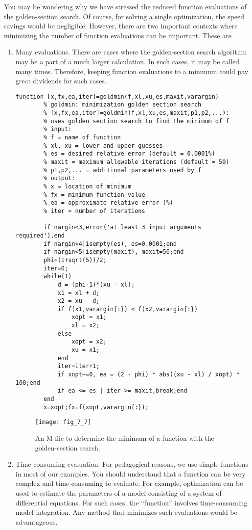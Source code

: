 \documentclass[../main.tex]{subfiles}
\begin{document}
You may be wondering why we have stressed the reduced function evaluations of the
golden-section search. Of course, for solving a single optimization, the speed savings
would be negligible. However, there are two important contexts where minimizing the
number of function evaluations can be important. These are
\begin{enumerate}
	\item Many evaluations. There are cases where the golden-section search algorithm may be a
	part of a much larger calculation. In such cases, it may be called many times. Therefore,
	keeping function evaluations to a minimum could pay great dividends for such cases.


	\begin{lstlisting}[numbers=none,frame=none]
		function [x,fx,ea,iter]=goldmin(f,xl,xu,es,maxit,varargin)
		% goldmin: minimization golden section search
		% [x,fx,ea,iter]=goldmin(f,xl,xu,es,maxit,p1,p2,...):
		% uses golden section search to find the minimum of f
		% input:
		% f = name of function
		% xl, xu = lower and upper guesses
		% es = desired relative error (default = 0.0001%)
		% maxit = maximum allowable iterations (default = 50)
		% p1,p2,... = additional parameters used by f
		% output:
		% x = location of minimum
		% fx = minimum function value
		% ea = approximate relative error (%)
		% iter = number of iterations

		if nargin<3,error('at least 3 input arguments required'),end
		if nargin<4|isempty(es), es=0.0001;end
		if nargin<5|isempty(maxit), maxit=50;end
		phi=(1+sqrt(5))/2;
		iter=0;
		while(1)
			d = (phi-1)*(xu - xl);
			x1 = xl + d;
			x2 = xu - d;
			if f(x1,varargin{:}) < f(x2,varargin{:})
				xopt = x1;
				xl = x2;
			else
				xopt = x2;
				xu = x1;
			end
			iter=iter+1;
			if xopt~=0, ea = (2 - phi) * abs((xu - xl) / xopt) * 100;end
			if ea <= es | iter >= maxit,break,end
		end
		x=xopt;fx=f(xopt,varargin{:});
	\end{lstlisting}

	\begin{figure}[H]
		\centering
		\texttt{[image: fig\_7\_7]}
		\caption{\textsf{An M-file to determine the minimum of a function with the golden-section search.}}
		\label{fig:fig_7_7}
	\end{figure}

	\item Time-consuming evaluation. For pedagogical reasons, we use simple functions in
	most of our examples. You should understand that a function can be very complex
	and time-consuming to evaluate. For example, optimization can be used to estimate
	the parameters of a model consisting of a system of differential equations. For such
	cases, the ``function'' involves time-consuming model integration. Any method that
	minimizes such evaluations would be advantageous.
\end{enumerate}
\end{document}
